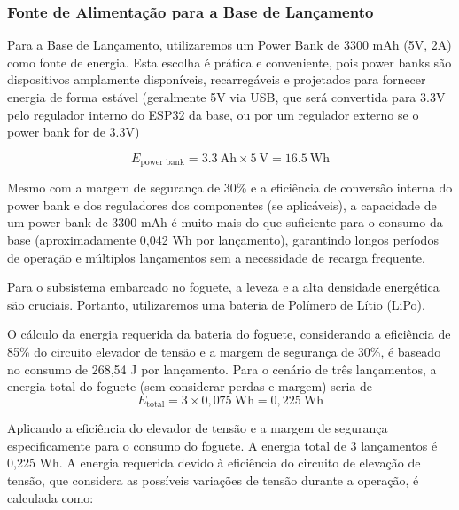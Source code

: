 \subsubsection{Fonte de Alimentação para a Base de Lançamento}


Para a Base de Lançamento, utilizaremos um Power Bank de 3300 mAh (5V, 2A) como fonte de energia. Esta escolha é prática e conveniente, pois power banks são dispositivos amplamente disponíveis, recarregáveis e projetados para fornecer energia de forma estável (geralmente 5V via USB, que será convertida para 3.3V pelo regulador interno do ESP32 da base, ou por um regulador externo se o power bank for de 3.3V) 

\begin{equation}
E_{\text{power bank}}
= 3.3~\mathrm{Ah} \times 5~\mathrm{V}
= 16.5~\mathrm{Wh}
\end{equation}

Mesmo com a margem de segurança de 30\% e a eficiência de conversão interna do power bank e dos reguladores dos componentes (se aplicáveis), a capacidade de um power bank de 3300 mAh é muito mais do que suficiente para o consumo da base (aproximadamente 0,042 Wh por lançamento), garantindo longos períodos de operação e múltiplos lançamentos sem a necessidade de recarga frequente. 


Para o subsistema embarcado no foguete, a leveza e a alta densidade energética são cruciais. Portanto, utilizaremos uma bateria de Polímero de Lítio (LiPo). 

O cálculo da energia requerida da bateria do foguete, considerando a eficiência de 85\% do circuito elevador de tensão e a margem de segurança de 30\%, é baseado no consumo de 268,54 J por lançamento. Para o cenário de três lançamentos, a energia total do foguete (sem considerar perdas e margem) seria de
\begin{equation}
E_{\text{total}} = 3 \times 0{,}075~\mathrm{Wh} = 0{,}225~\mathrm{Wh}
\end{equation}

Aplicando a eficiência do elevador de tensão e a margem de segurança especificamente para o consumo do foguete. A energia total de 3 lançamentos é 0,225 Wh. A energia requerida devido à eficiência do circuito de elevação de tensão, que considera as possíveis variações de tensão durante a operação, é calculada como:

